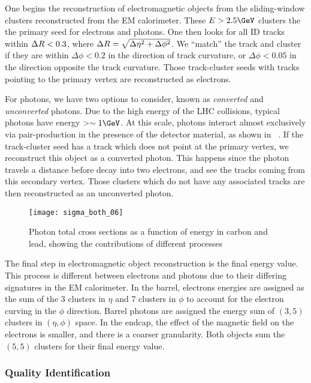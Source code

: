One begins the reconstruction of electromagnetic objects from the sliding-window clusters reconstructed from the EM calorimeter.
These $E > 2.5 \GeV$ clusters the the primary seed for electrons and photons.
One then looks for all ID tracks within $\Delta R < 0.3$, where $\Delta R = \sqrt{\Delta\eta^2 + \Delta\phi^2}$.
We ``match'' the track and cluster if they are within $\Delta \phi < 0.2$ in the direction of track curvature, or $\Delta \phi < 0.05$ in the direction opposite the track curvature.
Those track-cluster seeds with tracks pointing to the primary vertex are reconstructed as electrons.

For photons, we have two options to consider, known as \textit{converted} and \textit{unconverted} photons.
Due to the high energy of the LHC collisions, typical photons have energy $ >\order 1 \GeV$.
At this scale, photons interact almost exclusively via pair-production in the presence of the detector material, as shown in  ~\cite{Agashe:2014kda}.
If the track-cluster seed has a track which does not point at the primary vertex, we reconstruct this object as a converted photon.
This happens since the photon travels a distance before decay into two electrons, and see the tracks coming from this secondary vertex.
Those clusters which do not have any associated tracks are then reconstructed as an unconverted photon.
\begin{figure}
\caption{Photon total cross sections as a function of energy in carbon and lead, showing the contributions of different processes~\cite{Agashe:2014kda}} \label{fig:photon_pair_production}
\texttt{[image: sigma\_both\_06]}
\end{figure}

The final step in electromagnetic object reconstruction is the final energy value.
This process is different between electrons and photons due to their differing signatures in the EM calorimeter.
In the barrel, electrons energies are assigned as the sum of the 3 clusters in $\eta$ and 7 clusters in $\phi$ to account for the electron curving in the $\phi$ direction.
Barrel photons are assigned the energy sum of $(3,5)$ clusters in $(\eta, \phi)$ space.
In the endcap, the effect of the magnetic field on the electrons is smaller, and there is a coarser granularity.
Both objects sum the $(5,5)$ clusters for their final energy value.

\subsubsection{Quality Identification}

